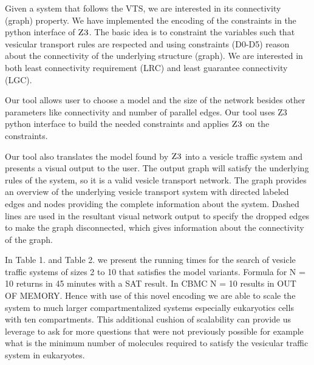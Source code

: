 Given a system that follows the VTS, we are interested in its connectivity (graph) property. We have implemented the encoding of the constraints in the python interface of $\textsc{Z3}$. The basic idea is to constraint the variables such that vesicular transport rules are respected and using constraints (D0-D5) reason about the connectivity of the underlying structure (graph). We are interested in both least connectivity requirement (LRC) and least guarantee connectivity (LGC).


%
Our tool allows user to choose a model and the size of the network besides other parameters like connectivity and number of parallel edges. Our tool uses Z3 python interface to build the needed constraints and applies $\textsc{Z3}$ on the constraints.

Our tool also translates the model found by $\textsc{Z3}$ into a vesicle traffic system and presents a visual
output to the user. The output graph will satisfy the underlying rules of the system, so it is a valid vesicle transport network. The graph provides an overview of the underlying vesicle transport system with directed labeled edges and nodes providing the complete information about the system. Dashed lines are used in the resultant visual network output to specify the dropped edges to make the graph disconnected, which gives information about the connectivity of the graph.


%
In Table 1. and Table 2.
we present the running times for the search of vesicle traffic systems of sizes 2 to 10 that satisfies the model variants. Formula for N = 10 returns in 45 minutes with a SAT result. In CBMC N = 10 results in OUT OF MEMORY. Hence with use of this novel encoding we are able to scale the system to much larger compartmentalized systems especially eukaryotics cells with ten compartments.  This additional cushion of scalability can provide us leverage to ask for more questions that were not previously possible for example what is the minimum number of molecules required to satisfy the vesicular traffic system in eukaryotes.

